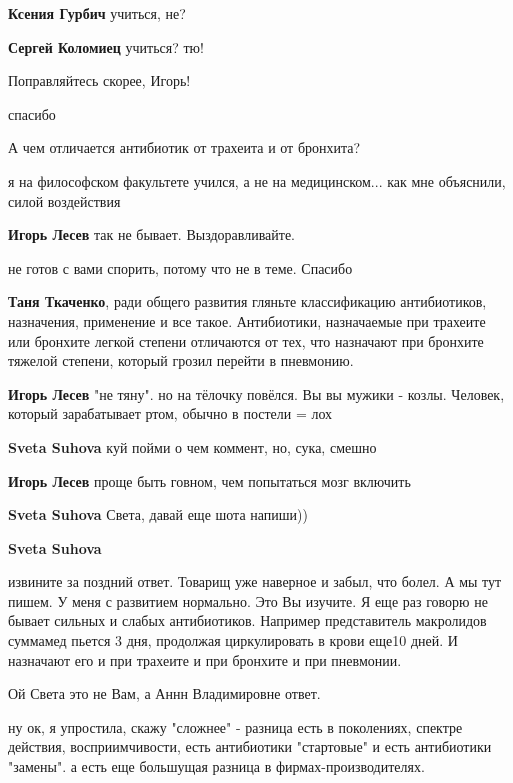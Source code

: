 \begin{itemize}
\begin{itemize}
\textbf{Ксения Гурбич} учиться, не?

\textbf{Сергей Коломиец} учиться? тю!
\end{itemize} %

Поправляйтесь скорее, Игорь!

спасибо

А чем отличается антибиотик от трахеита и от бронхита?

\begin{itemize} %
я на философском факультете учился, а не на медицинском... как мне объяснили, силой воздействия

\textbf{Игорь Лесев} так не бывает. Выздоравливайте.

не готов с вами спорить, потому что не в теме. Спасибо

\textbf{Таня Ткаченко}, ради общего развития гляньте классификацию антибиотиков, назначения, применение и все такое. Антибиотики, назначаемые при трахеите или бронхите легкой степени отличаются от тех, что назначают при бронхите тяжелой степени, который грозил перейти в пневмонию.

\textbf{Игорь Лесев} "не тяну". но на тёлочку повёлся. Вы вы мужики - козлы. Человек, который зарабатывает ртом, обычно в постели = лох

\textbf{Sveta Suhova} куй пойми о чем коммент, но, сука, смешно

\textbf{Игорь Лесев} проще быть говном, чем попытаться мозг включить

\textbf{Sveta Suhova} Света, давай еще шота напиши))

\textbf{Sveta Suhova} 

извините за поздний ответ. Товарищ уже наверное и забыл, что болел. А мы тут
пишем. У меня с развитием нормально. Это Вы изучите. Я еще раз говорю не бывает
сильных и слабых антибиотиков. Например представитель макролидов суммамед
пьется 3 дня, продолжая циркулировать в крови еще10 дней. И назначают его и при
трахеите и при бронхите и при пневмонии.


Ой Света это не Вам, а Аннн Владимировне ответ.


ну ок, я упростила, скажу "сложнее" - разница есть в поколениях, спектре
действия, восприимчивости, есть антибиотики "стартовые" и есть антибиотики
"замены". а есть еще большущая разница в фирмах-производителях.


\end{itemize}
\end{itemize}
